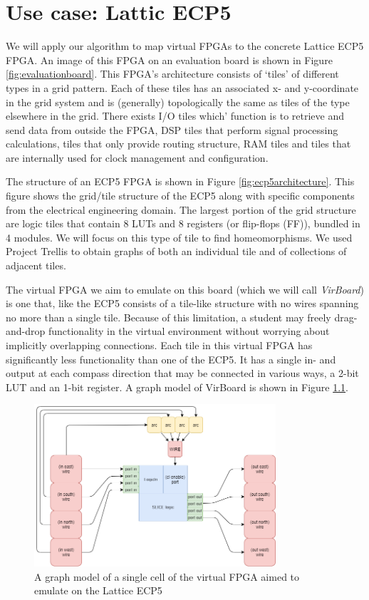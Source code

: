 \chapter{Use case: Lattic ECP5}
We will apply our algorithm to map virtual FPGAs to the concrete Lattice ECP5 FPGA. An image of this FPGA on an evaluation board is shown in Figure \ref{fig:evaluationboard}. This FPGA's architecture consists of `tiles' of different types in a grid pattern. Each of these tiles has an associated x- and y-coordinate in the grid system and is (generally) topologically the same as tiles of the type elsewhere in the grid. There exists I/O tiles which' function is to retrieve and send data from outside the FPGA, DSP tiles that perform signal processing calculations, tiles that only provide routing structure, RAM tiles and tiles that are internally used for clock management and configuration.

The structure of an ECP5 FPGA is shown in Figure \ref{fig:ecp5architecture}. This figure shows the grid/tile structure of the ECP5 along with specific components from the electrical engineering domain. The largest portion of the grid structure are logic tiles that contain 8 LUTs and 8 registers (or flip-flops (FF)), bundled in 4 modules. We will focus on this type of tile to find homeomorphisms. We used Project Trellis\cite{todo} to obtain graphs of both an individual tile and of collections of adjacent tiles.

The virtual FPGA we aim to emulate on this board (which we will call \textit{VirBoard}) is one that, like the ECP5 consists of a tile-like structure with no wires spanning no more than a single tile. Because of this limitation, a student may freely drag-and-drop functionality in the virtual environment without worrying about implicitly overlapping connections. Each tile in this virtual FPGA has significantly less functionality than one of the ECP5. It has a single in- and output at each compass direction that may be connected in various ways, a 2-bit LUT and an 1-bit register. A graph model of VirBoard is shown in Figure \ref{fig:virboard}.

\begin{figure}
\centering
\includegraphics[width=0.8\textwidth]{images/virtualFPGA.png}
\caption{A graph model of a single cell of the virtual FPGA aimed to emulate on the Lattice ECP5}
\label{fig:virboard}
\end{figure}	


